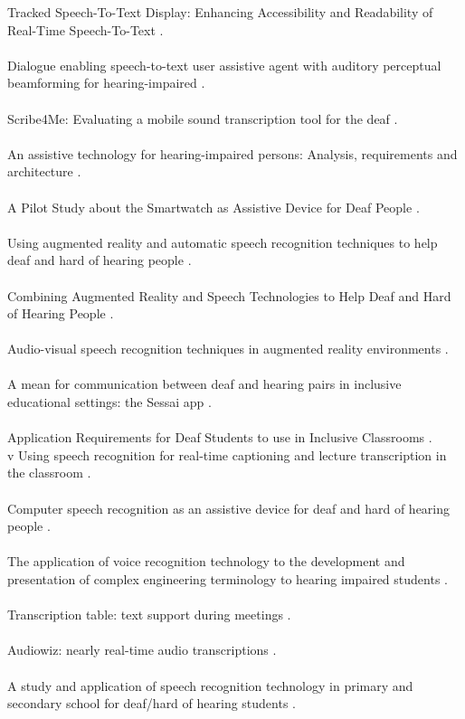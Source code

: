 \documentclass[english, 12pt, a4paper, pdftex, elec, utf8]{aaltothesis}
\begin{document}
Tracked Speech-To-Text Display: Enhancing Accessibility and Readability of Real-Time Speech-To-Text \cite{kushalnagar2015tracked}. \\\\
Dialogue enabling speech-to-text user assistive agent with auditory perceptual beamforming for hearing-impaired \cite{lee2013dialogue}. \\\\
Scribe4Me: Evaluating a mobile sound transcription tool for the deaf \cite{matthews2006scribe4me}. \\\\
An assistive technology for hearing-impaired persons: Analysis, requirements and architecture \cite{mielke2013assistive}. \\\\
A Pilot Study about the Smartwatch as Assistive Device for Deaf People \cite{mielke2015pilot}. \\\\
Using augmented reality and automatic speech recognition techniques to help deaf and hard of hearing people \cite{mirzaei2012}. \\\\
Combining Augmented Reality and Speech Technologies to Help Deaf and Hard of Hearing People \cite{mirzaei2012combining}. \\\\
Audio-visual speech recognition techniques in augmented reality environments \cite{mirzaei2014audio}. \\\\
A mean for communication between deaf and hearing pairs in inclusive educational settings: the Sessai app \cite{prietch2015mean}. \\\\
Application Requirements for Deaf Students to use in Inclusive Classrooms \cite{prietch2015application}. \\v
Using speech recognition for real-time captioning and lecture transcription in the classroom \cite{ranchal2013using}. \\\\
Computer speech recognition as an assistive device for deaf and hard of hearing people \cite{robison1996computer}. \\\\
The application of voice recognition technology to the development and presentation of complex engineering terminology to hearing impaired students \cite{stewart2003application}. \\\\
Transcription table: text support during meetings \cite{van2005transcription}. \\\\
Audiowiz: nearly real-time audio transcriptions \cite{white2010audiowiz}. \\\\
A study and application of speech recognition technology in primary and secondary school for deaf/hard of hearing students \cite{zhili2010study}. \\
\end{document}
